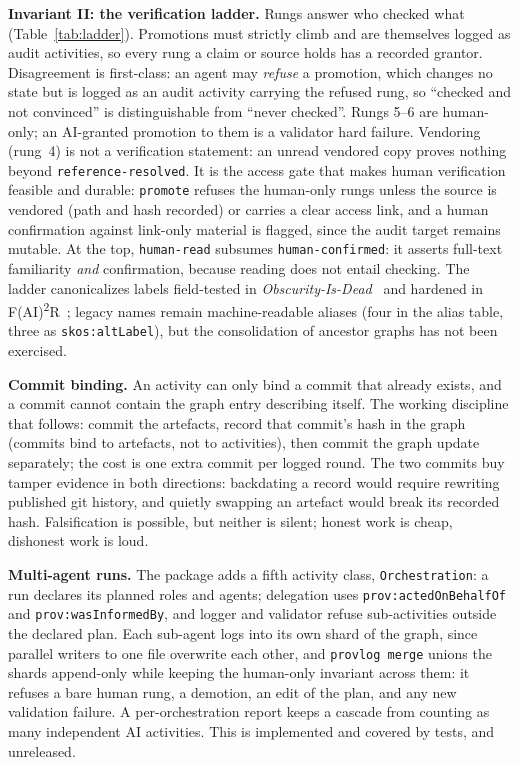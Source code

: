 \textbf{Invariant II: the verification ladder.} Rungs answer who
checked what (Table~\ref{tab:ladder}). Promotions must strictly climb
and are themselves logged as audit activities, so every rung a claim
or source holds has a recorded grantor. Disagreement is first-class: an
agent may \emph{refuse} a promotion, which changes no state but is
logged as an audit activity carrying the refused rung, so ``checked and
not convinced'' is distinguishable from ``never checked''. Rungs 5--6
are human-only; an AI-granted promotion to them is a validator hard
failure. Vendoring (rung~4) is not a verification statement: an unread
vendored copy proves nothing beyond \texttt{reference-resolved}. It is
the access gate that makes human verification feasible and durable:
\texttt{promote} refuses the human-only rungs unless the source is
vendored (path and hash recorded) or carries a clear access link, and
a human confirmation
against link-only material is flagged, since the audit target remains
mutable. At the top, \texttt{human-read} subsumes
\texttt{human-confirmed}: it asserts full-text familiarity \emph{and}
confirmation, because reading does not entail checking. The ladder
canonicalizes labels field-tested in
\emph{Obscurity-Is-Dead}~\cite{obscurity-is-dead} and hardened in
F(AI)\textsuperscript{2}R~\cite{fair2r-repo}; legacy names remain
machine-readable aliases (four in the alias table, three as
\texttt{skos:altLabel}), but the consolidation of ancestor graphs has
not been exercised.

\textbf{Commit binding.} An activity can only bind a commit that
already exists, and a commit cannot contain the graph entry describing
itself. The working discipline that follows: commit the artefacts,
record that commit's hash in the graph (commits bind to artefacts, not
to activities), then commit the graph update separately; the cost is one
extra commit per logged round. The two commits buy tamper evidence in
both directions: backdating a record would require rewriting published
git history, and quietly swapping an artefact would break its recorded
hash. Falsification is possible, but neither is silent; honest work is
cheap, dishonest work is loud.

\textbf{Multi-agent runs.} The package adds a fifth activity class,
\texttt{Orchestration}: a run declares its planned roles and agents; delegation uses \texttt{prov:actedOnBehalfOf}
and \texttt{prov:wasInformedBy}, and logger and validator refuse
sub-activities outside the declared plan. Each sub-agent logs into its
own shard of the graph, since parallel writers to one file overwrite
each other, and \texttt{provlog merge} unions the shards append-only
while keeping the human-only invariant across them: it refuses a bare
human rung, a demotion, an edit of the plan, and any new validation
failure. A per-orchestration report keeps a cascade from counting as
many independent AI activities. This is implemented and covered by
tests, and unreleased.

